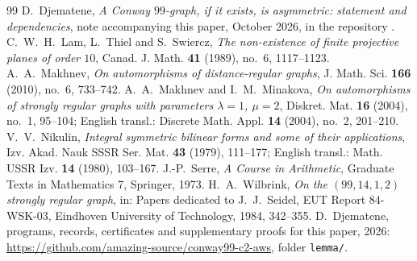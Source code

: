 \documentclass[11pt]{amsart}
\theoremstyle{definition}
\theoremstyle{remark}
\begin{document}
\begin{thebibliography}{99}
 D.~Djematene, \emph{A Conway $99$-graph, if it exists, is asymmetric: statement and dependencies}, note accompanying this
paper, October 2026, in the repository \cite{repo}.
 C.~W.~H.~Lam, L.~Thiel and S.~Swiercz, \emph{The non-existence of finite projective planes of order $10$},
Canad. J. Math. \textbf{41} (1989), no.~6, 1117--1123.
 A.~A.~Makhnev, \emph{On automorphisms of distance-regular graphs}, J. Math. Sci. \textbf{166} (2010),
no.~6, 733--742.
 A.~A.~Makhnev and I.~M.~Minakova, \emph{On automorphisms of strongly regular graphs with parameters
$\lambda=1$, $\mu=2$}, Diskret. Mat. \textbf{16} (2004), no.~1, 95--104; English transl.: Discrete Math. Appl. \textbf{14}
(2004), no.~2, 201--210.
 V.~V.~Nikulin, \emph{Integral symmetric bilinear forms and some of their applications}, Izv. Akad. Nauk
SSSR Ser. Mat. \textbf{43} (1979), 111--177; English transl.: Math. USSR Izv. \textbf{14} (1980), 103--167.
 J.-P.~Serre, \emph{A Course in Arithmetic}, Graduate Texts in Mathematics 7, Springer, 1973.
 H.~A.~Wilbrink, \emph{On the $(99,14,1,2)$ strongly regular graph}, in: Papers dedicated to J.~J.~Seidel,
EUT Report 84-WSK-03, Eindhoven University of Technology, 1984, 342--355.
 D.~Djematene, programs, records, certificates and supplementary proofs for this paper, 2026:
\url{https://github.com/amazing-source/conway99-c2-aws}, folder \texttt{lemma/}.
\end{thebibliography}
\end{document}
